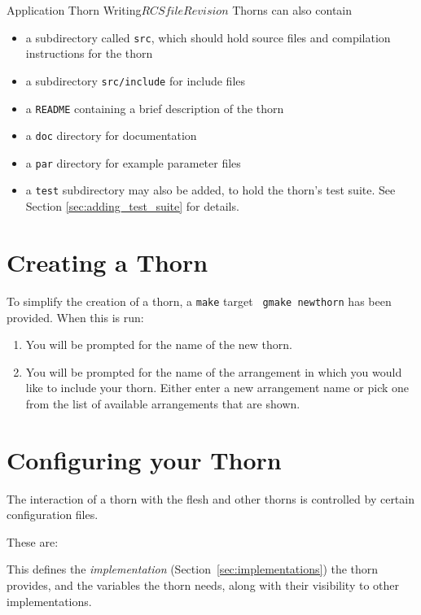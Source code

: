 \begin{cactuspart}{Application Thorn Writing}{$RCSfile$}{$Revision$}
Thorns can also contain
\begin{itemize}
\item a subdirectory called \texttt{src}, which should hold source files
        and compilation instructions for the thorn
\item a subdirectory \texttt{src/include} for include files
\item a \texttt{README} containing a brief description of the thorn
\item a \texttt{doc} directory for documentation
\item a \texttt{par} directory for example parameter files
\item a \texttt{test} subdirectory may also be added, to hold the thorn's
    test suite. See Section \ref{sec:adding_test_suite} for details.
\end{itemize}


\section{Creating a Thorn}


To simplify the creation of a thorn, a \texttt{make} target {\tt
gmake newthorn} has been provided. When this is run:

\begin{enumerate}
\item{} You will be prompted for the name of the new thorn.
\item{} You will be prompted for the name of the arrangement in which you
would like to include your thorn. Either enter a new arrangement name or
pick one from the list of available arrangements that are shown.
\end{enumerate}


\section{Configuring your Thorn}

The interaction of a thorn with the flesh and other thorns is controlled
by certain configuration files.

These are:

\begin{Lentry}

\item [\texttt{interface.ccl}]
This defines the \textit{implementation} (Section~\ref{sec:implementations})
the thorn provides, and the variables the thorn needs, along with their
visibility to other implementations.


\end{Lentry}
\end{cactuspart}
